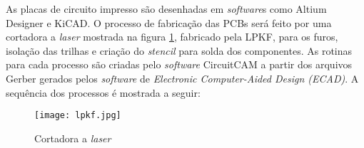 As placas de circuito impresso são desenhadas em \textit{software}s como Altium Designer e KiCAD. O processo de fabricação das PCBs será feito por uma cortadora a \textit{\textit{laser}} mostrada na figura \ref{lpkf}, fabricado pela LPKF, para os furos, isolação das trilhas e criação do \textit{stencil} para solda dos componentes. As rotinas para cada processo são criadas pelo \textit{software} CircuitCAM a partir dos arquivos Gerber gerados pelos \textit{software} de \textit{Electronic Computer-Aided Design (ECAD)}. A sequência dos processos é mostrada a seguir:

 \begin{figure}[htbp]
    \centering
    \caption{Cortadora a \textit{laser}}
    \texttt{[image: lpkf.jpg]}
    
    \centering
    \label{lpkf}
\end{figure}


